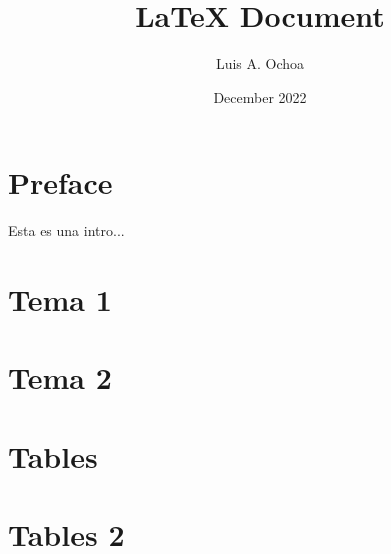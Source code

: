 \documentclass[12pt, letterpaper]{memoir}
\begin{document}
%
%
\title{LaTeX Document}
\author{Luis A. Ochoa}
\date{December 2022}
\maketitle


\clearpage
\tableofcontents
\clearpage
\listoffigures
\clearpage
\listoftables

\chapter{Preface}

  \lipsum[2-4]

Esta es una intro...

%
%
\mainmatter

\chapter{Tema 1}
  

\chapter{Tema 2}
  

%
%
\appendix

\chapter{Tables}
  

\chapter{Tables 2}
  

%
%
\backmatter

\printbibliography[heading=bibintoc]
\end{document}
